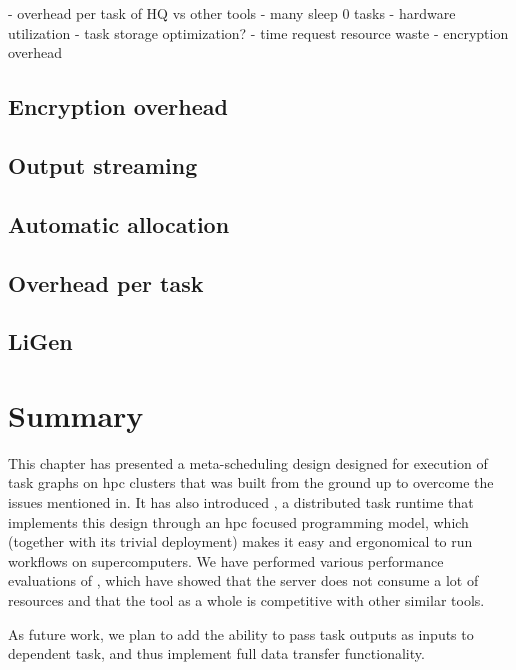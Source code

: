 - overhead per task of HQ vs other tools
- many sleep 0 tasks
- hardware utilization
- task storage optimization?
- time request resource waste
- encryption overhead

\subsection{Encryption overhead}
\label{sec:hq-exp-encryption-overhead}

\subsection{Output streaming}
\label{sec:hq-exp-output-streaming}

\subsection{Automatic allocation}
\label{sec:hq-exp-autoalloc}

\subsection{Overhead per task}
\label{sec:hq-exp-overhead-per-task}

\subsection{LiGen}
\label{sec:hq-exp-ligen}

\section*{Summary}
This chapter has presented a meta-scheduling design designed for execution of task graphs on
\gls{hpc} clusters that was built from the ground up to overcome the issues mentioned
in. It has also introduced \hyperqueue{}, a distributed task
runtime that implements this design through an \gls{hpc} focused programming model,
which (together with its trivial deployment) makes it easy and ergonomical to run workflows on
supercomputers.  We have performed various performance evaluations%
of \hyperqueue{}, which have showed that the server does not consume a lot of resources
and that the tool as a whole is competitive with other similar tools.


As future work, we plan to add the ability to pass task outputs as inputs to dependent task, and
thus implement full data transfer functionality.

